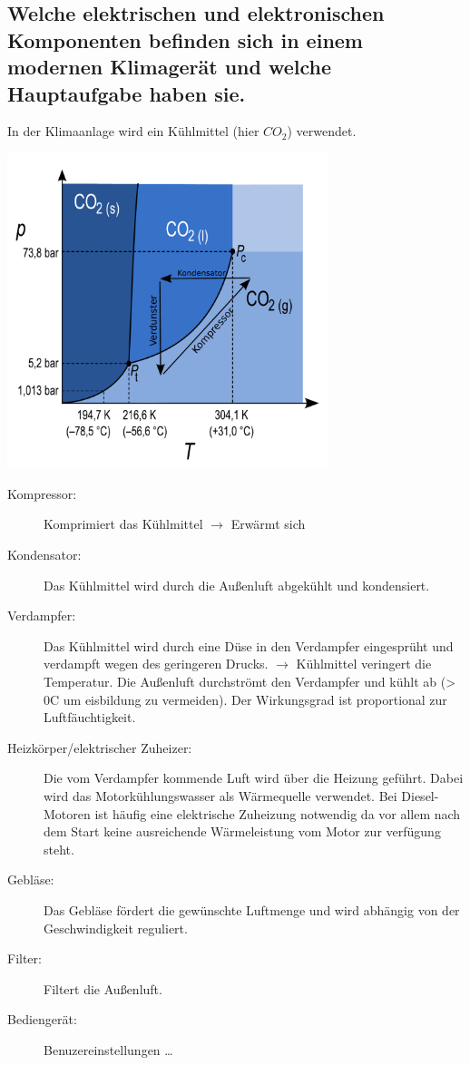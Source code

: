 \subsection{Welche elektrischen und elektronischen Komponenten
  befinden sich in einem modernen Klimager\"at und welche Hauptaufgabe
  haben sie.}
In der Klimaanlage wird ein Kühlmittel (hier $CO_2$) verwendet. 
\begin{center}
  \includegraphics[width=0.7\textwidth]{pics/Carbon_dioxide_p-T_phase_diagram}
\end{center}

\begin{description}
\item[Kompressor:] Komprimiert das Kühlmittel $\rightarrow$ Erwärmt sich
\item[Kondensator:] Das Kühlmittel wird durch die Außenluft abgekühlt
  und kondensiert.
\item[Verdampfer:] Das Kühlmittel wird durch eine Düse in den
  Verdampfer eingesprüht und verdampft wegen des geringeren
  Drucks. $\rightarrow$ Kühlmittel veringert die Temperatur. Die
  Außenluft durchströmt den Verdampfer und kühlt ab (\textgreater
  0\textdegree C um eisbildung zu vermeiden). Der Wirkungsgrad ist
  proportional zur Luftfäuchtigkeit.
\item[Heizkörper/elektrischer Zuheizer:] Die vom Verdampfer kommende
  Luft wird über die Heizung geführt. Dabei wird das
  Motorkühlungswasser als Wärmequelle verwendet. Bei Diesel-Motoren
  ist häufig eine elektrische Zuheizung notwendig da vor allem nach
  dem Start keine ausreichende Wärmeleistung vom Motor zur verfügung steht. 
\item[Gebläse:] Das Gebläse fördert die gewünschte Luftmenge und wird
  abhängig von der Geschwindigkeit reguliert.
\item[Filter:] Filtert die Außenluft.
\item[Bediengerät:] Benuzereinstellungen \dots
\end{description}


